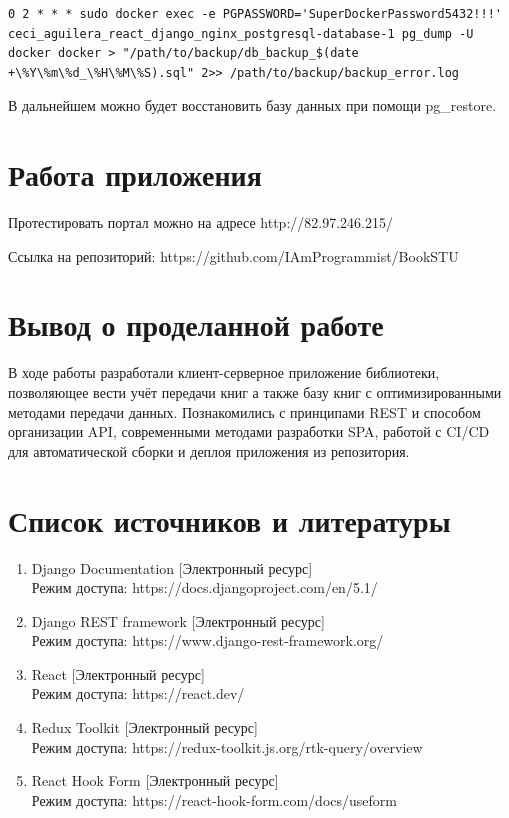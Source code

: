 \documentclass[a4paper,14pt]{extarticle}
\begin{document}
\begin{verbatim}
0 2 * * * sudo docker exec -e PGPASSWORD='SuperDockerPassword5432!!!' ceci_aguilera_react_django_nginx_postgresql-database-1 pg_dump -U docker docker > "/path/to/backup/db_backup_$(date +\%Y\%m\%d_\%H\%M\%S).sql" 2>> /path/to/backup/backup_error.log
\end{verbatim}

В дальнейшем можно будет восстановить
базу данных при помощи pg\_restore.

\section{Работа приложения}

Протестировать портал можно на адресе http://82.97.246.215/

Ссылка на репозиторий: https://github.com/IAmProgrammist/BookSTU

\section{Вывод о проделанной работе}
В ходе работы разработали клиент-серверное приложение библиотеки, позволяющее
вести учёт передачи книг а также базу книг с оптимизированными методами передачи
данных. Познакомились с принципами REST и способом организации API, 
современными методами разработки SPA, работой с CI/CD для автоматической сборки
и деплоя приложения из репозитория.
\newpage

\section{Список источников и литературы}
\begin{enumerate}
    \item Django Documentation [Электронный ресурс] \\Режим доступа: https://docs.djangoproject.com/en/5.1/
    \item Django REST framework [Электронный ресурс] \\Режим доступа: https://www.django-rest-framework.org/
    \item React [Электронный ресурс] \\Режим доступа: https://react.dev/
    \item Redux Toolkit [Электронный ресурс] \\Режим доступа: https://redux-toolkit.js.org/rtk-query/overview
    \item React Hook Form [Электронный ресурс] \\Режим доступа: https://react-hook-form.com/docs/useform
\end{enumerate}
\end{document}
